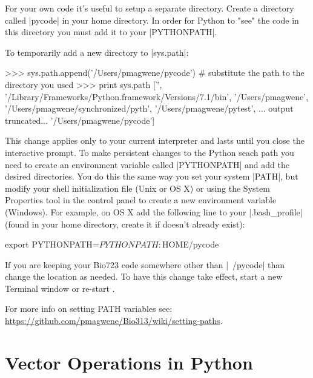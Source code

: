 For your own code it's useful to setup a separate directory. Create a directory called |pycode| in your home directory. In order for Python to "see" the code in this directory you must add it to your |PYTHONPATH|.

To temporarily add a new directory to |sys.path|:
\begin{python}
>>> sys.path.append('/Users/pmagwene/pycode') # substitute the path to the directory you used
>>> print sys.path
['', '/Library/Frameworks/Python.framework/Versions/7.1/bin', '/Users/pmagwene', 
'/Users/pmagwene/synchronized/pyth', '/Users/pmagwene/pytest', 
... output truncated...
'/Users/pmagwene/pycode']
\end{python}

This change applies only to your current interpreter and lasts until you close the interactive prompt. To make persistent changes to the Python seach path you need to create an environment variable called |PYTHONPATH| and add the desired directories.  You do this the same way you set your system |PATH|, but modify your shell initialization file (Unix or OS X) or using the System Properties tool in the control panel to create a new environment variable (Windows). For example, on OS X add the following line to your |.bash_profile| (found in your home directory, create it if doesn't already exist):
%
\begin{bash}
export PYTHONPATH=$PYTHONPATH:$HOME/pycode   
\end{bash}
%
If you are keeping your Bio723 code somewhere other than |~/pycode| than change the location as needed. To have this change take effect, start a new Terminal window or re-start \ipy.

For more info on setting PATH variables see: \url{https://github.com/pmagwene/Bio313/wiki/setting-paths}.

\section{Vector Operations in Python}

